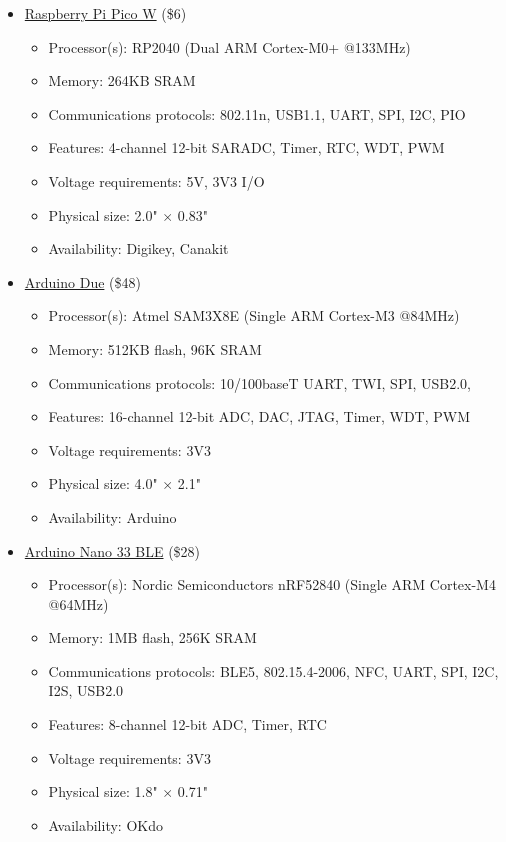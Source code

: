 \begin{flushleft}
\begin{itemize}
        \item
        \href{https://www.raspberrypi.com/products/raspberry-pi-pico/}{Raspberry Pi Pico W} (\$6)
        \begin{itemize}
            \item Processor(s): RP2040 (Dual ARM Cortex-M0+ @133MHz)
            \item Memory: 264KB SRAM
            \item Communications protocols: 802.11n, USB1.1, UART, SPI, I2C, PIO
            \item Features: 4-channel 12-bit SARADC, Timer, RTC, WDT, PWM
            \item Voltage requirements: 5V, 3V3 I/O
            \item Physical size: 2.0" $\times$ 0.83"
            \item Availability: Digikey, Canakit
        \end{itemize}

        \item
        \href{https://store-usa.arduino.cc/products/arduino-due?selectedStore=us}{Arduino Due} (\$48)
        \begin{itemize}
            \item Processor(s): Atmel SAM3X8E (Single ARM Cortex-M3 @84MHz)
            \item Memory: 512KB flash, 96K SRAM 
            \item Communications protocols: 10/100baseT UART, TWI, SPI, USB2.0,\
            \item Features: 16-channel 12-bit ADC, DAC, JTAG, Timer, WDT, PWM
            \item Voltage requirements: 3V3
            \item Physical size: 4.0" $\times$ 2.1"
            \item Availability: Arduino
        \end{itemize}

        \item
        \href{https://store-usa.arduino.cc/products/arduino-nano-33-ble?selectedStore=u}{Arduino Nano 33
        BLE} (\$28)
        \begin{itemize}
            \item Processor(s): Nordic Semiconductors nRF52840 (Single ARM Cortex-M4 @64MHz)
            \item Memory: 1MB flash, 256K SRAM
            \item Communications protocols: BLE5, 802.15.4-2006, NFC, UART, SPI, I2C, I2S, USB2.0
            \item Features: 8-channel 12-bit ADC, Timer, RTC
            \item Voltage requirements: 3V3
            \item Physical size: 1.8" $\times$ 0.71"
            \item Availability: OKdo
        \end{itemize}


\end{itemize}
\end{flushleft}
